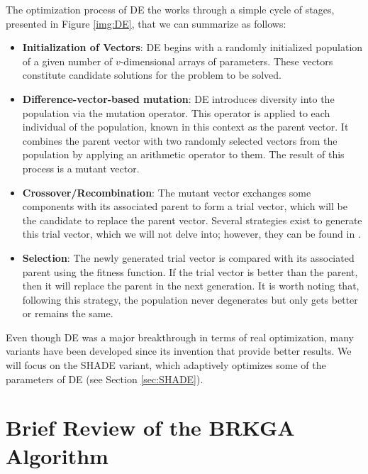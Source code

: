 \documentclass[review]{elsarticle}
\begin{document}
The optimization process of DE the works through a simple cycle of stages, presented in Figure \ref{img:DE}, that we can summarize as follows:

\begin{itemize}
	
	\item \textbf{Initialization of Vectors}: DE begins with a randomly initialized population of a given number of $v$-dimensional arrays of parameters. These vectors constitute candidate solutions for the problem to be solved.
	
	\item \textbf{Difference-vector-based mutation}: DE introduces diversity into the population via the mutation operator. This operator is applied to each individual of the population, known in this context as the parent vector. It combines the parent vector with two randomly selected vectors from the population by applying an arithmetic operator to them. The result of this process is a mutant vector.
	
	\item \textbf{Crossover/Recombination}: The mutant vector exchanges some components with its associated parent to form a trial vector, which will be the candidate to replace the parent vector. Several strategies exist to generate this trial vector, which we will not delve into; however, they can be found in \cite{das2011differential}.
	
	\item \textbf{Selection}: The newly generated trial vector is compared with its associated parent using the fitness function. If the trial vector is better than the parent, then it will replace the parent in the next generation. It is worth noting that, following this strategy, the population never degenerates but only gets better or remains the same.
	
\end{itemize}

Even though DE was a major breakthrough in terms of real optimization, many variants have been developed since its invention that provide better results. We will focus on the SHADE variant, which adaptively optimizes some of the parameters of DE (see Section \ref{sec:SHADE}).

\section{Brief Review of the BRKGA Algorithm} \label{sec:brkga}
\end{document}
